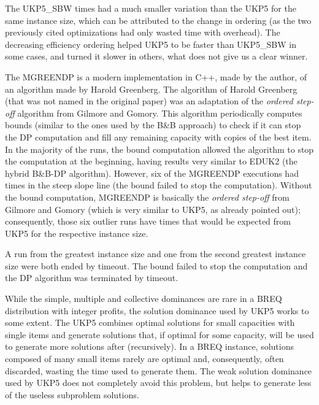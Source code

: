 The UKP5\_SBW times had a much smaller variation than the UKP5 for the same instance size, which can be attributed to the change in ordering (as the two previously cited optimizations had only wasted time with overhead).
The decreasing efficiency ordering helped UKP5 to be faster than UKP5\_SBW in some cases, and turned it slower in others, what does not give us a clear winner.

The MGREENDP is a modern implementation in C++, made by the author, of an algorithm made by Harold Greenberg.
The algorithm of Harold Greenberg (that was not named in the original paper) was an adaptation of the \emph{ordered step-off} algorithm from Gilmore and Gomory.
This algorithm periodically computes bounds (similar to the ones used by the B\&B approach) to check if it can stop the DP computation and fill any remaining capacity with copies of the best item.
In the majority of the runs, the bound computation allowed the algorithm to stop the computation at the beginning, having results very similar to EDUK2 (the hybrid B\&B-DP algorithm).
However, six of the MGREENDP executions had times in the steep slope line (the bound failed to stop the computation).
Without the bound computation, MGREENDP is basically the \emph{ordered step-off} from Gilmore and Gomory (which is very similar to UKP5, as already pointed out); consequently, those six outlier runs have times that would be expected from UKP5 for the respective instance size.

A run from the greatest instance size and one from the second greatest instance size were both ended by timeout.
The bound failed to stop the computation and the DP algorithm was terminated by timeout.

While the simple, multiple and collective dominances are rare in a BREQ distribution with integer profits, the solution dominance used by UKP5 works to some extent.
The UKP5 combines optimal solutions for small capacities with single items and generate solutions that, if optimal for some capacity, will be used to generate more solutions after (recursively).
In a BREQ instance, solutions composed of many small items rarely are optimal and, consequently, often discarded, wasting the time used to generate them.
The weak solution dominance used by UKP5 does not completely avoid this problem, but helps to generate less of the useless subproblem solutions.

